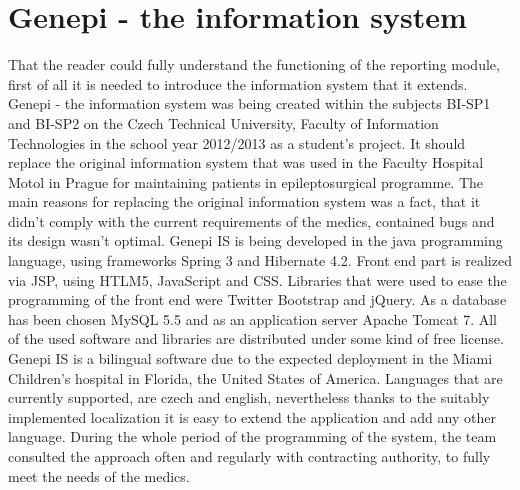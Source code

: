 \documentclass[thesis=B,english]{FITthesis}[2012/10/20]
\begin{document}
\section{Genepi - the information system}
That the reader could fully understand the functioning of the reporting module, first of all it is needed to introduce the information system that it extends. Genepi - the information system was being created within the subjects BI-SP1 and BI-SP2 on the Czech Technical University, Faculty of Information Technologies in the school year 2012/2013 as a student's project. It should replace the original information system that was used in the Faculty Hospital Motol in Prague for maintaining patients in epileptosurgical programme. The main reasons for replacing the original information system was a fact, that it didn't comply with the current requirements of the medics, contained bugs and its design wasn't optimal. Genepi IS is being developed in the java programming language, using frameworks Spring 3 and Hibernate 4.2. Front end part is realized via JSP, using HTLM5, JavaScript and CSS. Libraries that were used to ease the programming of the front end were Twitter Bootstrap and jQuery. As a database has been chosen MySQL 5.5 and as an application server Apache Tomcat 7. All of the used software and libraries are distributed under some kind of free license. Genepi IS is a bilingual software due to the expected deployment in the Miami Children's hospital in Florida, the United States of America. Languages that are currently supported, are czech and english, nevertheless thanks to the suitably implemented localization it is easy to extend the application and add any other language. During the whole period of the programming of the system, the team consulted the approach often  and regularly with contracting authority, to fully meet the needs of the medics.
\end{document}
